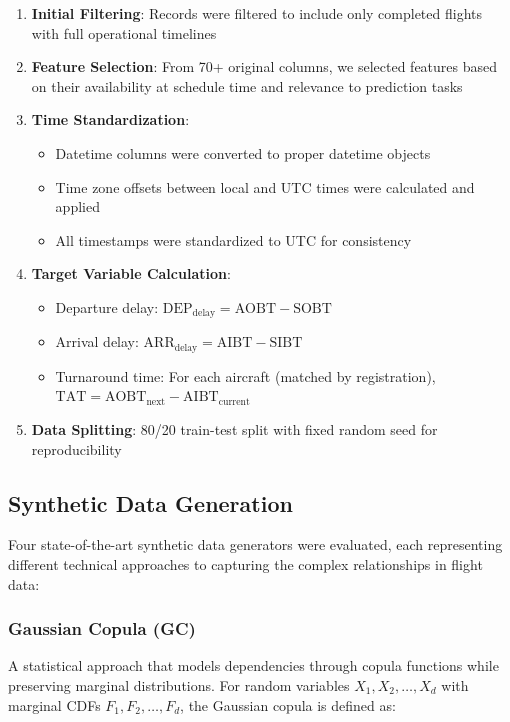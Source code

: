 \documentclass[conference]{IEEEtran}
\begin{document}
\begin{enumerate}
    \item \textbf{Initial Filtering}: Records were filtered to include only completed flights with full operational timelines
    \item \textbf{Feature Selection}: From 70+ original columns, we selected features based on their availability at schedule time and relevance to prediction tasks
    \item \textbf{Time Standardization}: 
    \begin{itemize}
        \item Datetime columns were converted to proper datetime objects
        \item Time zone offsets between local and UTC times were calculated and applied
        \item All timestamps were standardized to UTC for consistency
    \end{itemize}
    \item \textbf{Target Variable Calculation}:
    \begin{itemize}
        \item Departure delay: $\text{DEP}_{\text{delay}} = \text{AOBT} - \text{SOBT}$
        \item Arrival delay: $\text{ARR}_{\text{delay}} = \text{AIBT} - \text{SIBT}$
        \item Turnaround time: For each aircraft (matched by registration), $\text{TAT} = \text{AOBT}_{\text{next}} - \text{AIBT}_{\text{current}}$
    \end{itemize}
    \item \textbf{Data Splitting}: 80/20 train-test split with fixed random seed for reproducibility
\end{enumerate}

\subsection{Synthetic Data Generation}
Four state-of-the-art synthetic data generators were evaluated, each representing different technical approaches to capturing the complex relationships in flight data:

\subsubsection{Gaussian Copula (GC)}
A statistical approach that models dependencies through copula functions while preserving marginal distributions. For random variables $X_1, X_2, \ldots, X_d$ with marginal CDFs $F_1, F_2, \ldots, F_d$, the Gaussian copula is defined as:
\end{document}
